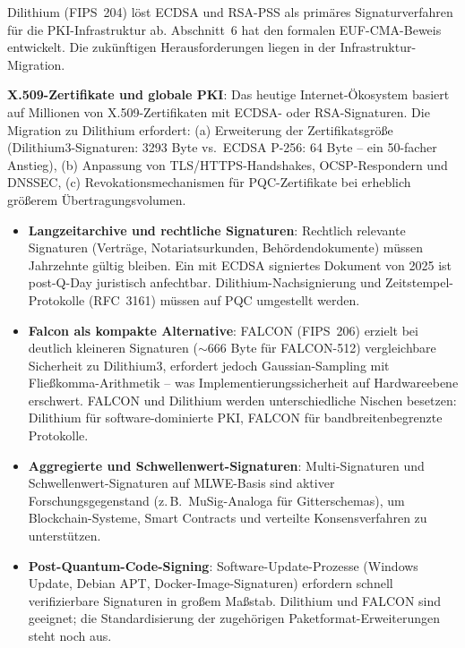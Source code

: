 ﻿\documentclass[a4paper,12pt]{article}
\theoremstyle{definition}
\begin{document}
Dilithium (FIPS~204) löst ECDSA und RSA-PSS als primäres
Signaturverfahren für die PKI-Infrastruktur ab. Abschnitt~6 hat
den formalen EUF-CMA-Beweis entwickelt. Die zukünftigen
Herausforderungen liegen in der Infrastruktur-Migration.

\textbf{X.509-Zertifikate und globale PKI}: Das heutige
Internet-Ökosystem basiert auf Millionen von X.509-Zertifikaten
mit ECDSA- oder RSA-Signaturen. Die Migration zu Dilithium erfordert:
(a) Erweiterung der Zertifikatsgröße (Dilithium3-Signaturen: 3293 Byte
vs.\ ECDSA P-256: 64 Byte -- ein 50-facher Anstieg),
(b) Anpassung von TLS/HTTPS-Handshakes, OCSP-Respondern und DNSSEC,
(c) Revokationsmechanismen für PQC-Zertifikate bei erheblich
größerem Übertragungsvolumen.

\begin{itemize}
  \item \textbf{Langzeitarchive und rechtliche Signaturen}:
    Rechtlich relevante Signaturen (Verträge, Notariatsurkunden,
    Behördendokumente) müssen Jahrzehnte gültig bleiben.
    Ein mit ECDSA signiertes Dokument von 2025 ist post-Q-Day
    juristisch anfechtbar. Dilithium-Nachsignierung und
    Zeitstempel-Protokolle (RFC~3161) müssen auf PQC umgestellt werden.
  \item \textbf{Falcon als kompakte Alternative}: FALCON (FIPS~206)
    erzielt bei deutlich kleineren Signaturen ($\sim$666 Byte für
    FALCON-512) vergleichbare Sicherheit zu Dilithium3, erfordert
    jedoch Gaussian-Sampling mit Fließkomma-Arithmetik --
    was Implementierungssicherheit auf Hardwareebene erschwert.
    FALCON und Dilithium werden unterschiedliche Nischen besetzen:
    Dilithium für software-dominierte PKI,
    FALCON für bandbreitenbegrenzte Protokolle.
  \item \textbf{Aggregierte und Schwellenwert-Signaturen}:
    Multi-Signaturen und Schwellenwert-Signaturen auf MLWE-Basis
    sind aktiver Forschungsgegenstand (z.\,B.\ MuSig-Analoga für
    Gitterschemas), um Blockchain-Systeme, Smart Contracts und
    verteilte Konsensverfahren zu unterstützen.
  \item \textbf{Post-Quantum-Code-Signing}: Software-Update-Prozesse
    (Windows Update, Debian APT, Docker-Image-Signaturen) erfordern
    schnell verifizierbare Signaturen in großem Maßstab. Dilithium
    und FALCON sind geeignet; die Standardisierung der
    zugehörigen Paketformat-Erweiterungen steht noch aus.
\end{itemize}

\end{document}
